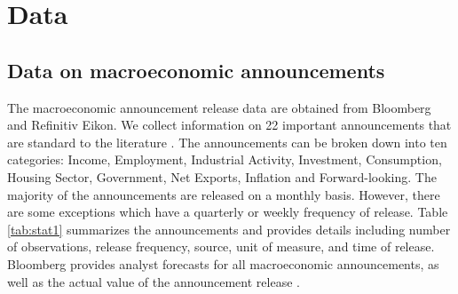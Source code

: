 \section{Data}
%

\subsection{Data on macroeconomic announcements}
 
The macroeconomic announcement release data are obtained from Bloomberg and Refinitiv Eikon. We collect information on 22 important  announcements that are standard to the literature \citep[see e.g.,][]{andersen1998deutsche,kurov2019price}. The announcements can be broken down into ten categories: Income, Employment, Industrial Activity, Investment, Consumption, Housing Sector, Government, Net Exports, Inflation and Forward-looking. The majority of the announcements are released on a monthly basis. However, there are some exceptions which have a quarterly or weekly frequency of release. Table \ref{tab:stat1} summarizes the announcements and provides details including number of observations, release frequency, source, unit of measure, and time of release. Bloomberg provides analyst forecasts for all macroeconomic announcements, as well as the actual value of the announcement release \citep[see e.g.,][]{kurov2019price}. 

